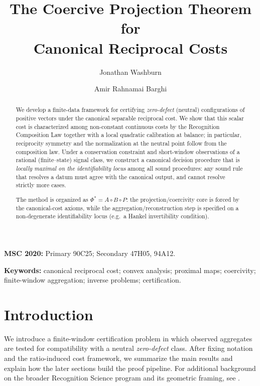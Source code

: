 \documentclass[11pt,reqno]{amsart}
\title[Coercive Projection Theorem]{The Coercive Projection Theorem for\\
Canonical Reciprocal Costs}
\author{Jonathan Washburn}
\author{Amir Rahnamai Barghi}
\date{} %
\theoremstyle{definition}
\theoremstyle{remark}
\newcommand{\1}{\mathbf{1}}
\begin{document}
\begin{abstract}
We develop a finite-data framework for certifying \emph{zero-defect} (neutral) configurations of positive vectors under the canonical separable reciprocal cost.
We show that this scalar cost is characterized among non-constant continuous costs by the Recognition Composition Law together with a local quadratic calibration at balance; in particular, reciprocity symmetry and the normalization at the neutral point follow from the composition law.
Under a conservation constraint and short-window observations of a rational (finite--state) signal class, we construct a canonical decision procedure that is \emph{locally maximal on the identifiability locus} among all sound procedures: any sound rule that resolves a datum must agree with the canonical output, and cannot resolve strictly more cases.

The method is organized as $\Phi^\ast=A\circ B\circ P$: the projection/coercivity core is forced by the canonical-cost axioms, while the aggregation/reconstruction step is specified on a non-degenerate identifiability locus (e.g.\ a Hankel invertibility condition).

\end{abstract}
\maketitle
\par\medskip
\noindent\textbf{MSC 2020:} Primary 90C25; Secondary 47H05, 94A12.\par
\noindent\textbf{Keywords:} canonical reciprocal cost; convex analysis; proximal maps; coercivity; finite-window aggregation; inverse problems; certification.\par
\medskip

\section{Introduction}

We introduce a finite-window certification problem in which observed aggregates are tested for compatibility with a neutral \emph{zero-defect} class. After fixing notation and the ratio-induced cost framework, we summarize the main results and explain how the later sections build the proof pipeline. For additional background on the broader Recognition Science program and its geometric framing, see \cite{washburnnetal2026RG}.
\end{document}
